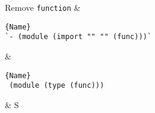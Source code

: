 Remove \texttt{function} 
&  
        \vspace{-4mm}
\begin{lstlisting}[numbers=none]{Name}
`- (module (import "" "" (func)))`
        \end{lstlisting}   
&  
        \vspace{-4mm}
\begin{lstlisting}[numbers=none]{Name}
 (module (type (func)))

        \end{lstlisting}  
        \vspace{-4mm}
&   S \\

\hline
